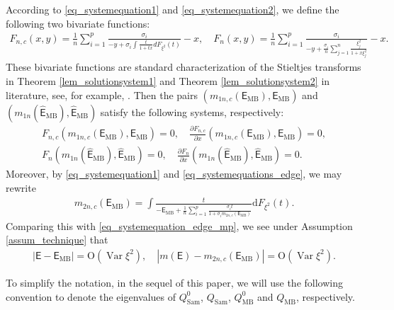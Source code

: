 \documentclass[12pt]{article}
\theoremstyle{plain}
\numberwithin{equation}{section}
\begin{document}
According to \eqref{eq_systemequation1} and \eqref{eq_systemequation2}, we define the following two bivariate functions: 
\begin{align}\label{eq_def_systemequation}
	F_{n,c}(x,y)=\frac{1}{n}\sum_{i=1}^p\frac{\sigma_i}{-y+\sigma_i\int\frac{t}{1+tx}dF_{\xi^2}(t)}-x,\quad F_n(x,y)=\frac{1}{n}\sum_{i=1}^p\frac{\sigma_i}{-y+\frac{\sigma_i}{n}\sum_{j=1}^n\frac{\xi^2_j}{1+x\xi^2_j}}-x.
\end{align}
These bivariate functions are standard characterization of the Stieltjes transforms in Theorem \ref{lem_solutionsystem1} and Theorem \ref{lem_solutionsystem2} in literature, see, for example, \citep{DingYang2021,YuZhaoZhou2025,boostsanalysis}.
Then the pairs $(m_{1n,c}(\mathsf{E}_{\mathrm{MB}}),\mathsf{E}_{\mathrm{MB}})$ and $(m_{1n}(\widehat{\mathsf{E}}_{\mathrm{MB}}),\widehat{\mathsf{E}}_{\mathrm{MB}})$ satisfy the following systems, respectively:
\begin{gather}\label{eq_systemequations_edge}
	F_{n,c}(m_{1n,c}(\mathsf{E}_{\mathrm{MB}}),\mathsf{E}_{\mathrm{MB}})=0,\quad \frac{\partial F_{n,c}}{\partial x}(m_{1n,c}(\mathsf{E}_{\mathrm{MB}}),\mathsf{E}_{\mathrm{MB}})=0,\\
	F_{n}(m_{1n}(\widehat{\mathsf{E}}_{\mathrm{MB}}),\widehat{\mathsf{E}}_{\mathrm{MB}})=0,\quad\frac{\partial F_n}{\partial x}(m_{1n}(\widehat{\mathsf{E}}_{\mathrm{MB}}),\widehat{\mathsf{E}}_{\mathrm{MB}})=0.
\end{gather}
Moreover, by \eqref{eq_systemequation1} and \eqref{eq_systemequations_edge}, we may rewrite
\begin{align*}
	m_{2n,c}(\mathsf{E}_{\mathrm{MB}})=\int\frac{t}{-\mathsf{E}_{\mathrm{MB}}+\frac{1}{n}\sum_{i=1}^p\frac{\sigma_i t}{1+\sigma_im_{2n,c}(\mathsf{E}_{\mathrm{MB}})}}\mathrm{d}F_{\xi^2}(t).
\end{align*}
Comparing this with \eqref{eq_systemequation_edge_mp}, we see under Assumption \ref{assum_technique} that
\begin{align}\label{eq_control_edgebias}
	|\mathsf{E}-\mathsf{E}_{\mathrm{MB}}|=\mathrm{O}(\operatorname{Var}\xi^2),\quad |m(\mathsf{E})-m_{2n,c}(\mathsf{E}_{\mathrm{MB}})|=\mathrm{O}(\operatorname{Var}\xi^2).
\end{align}

To simplify the notation, in the sequel of this paper, we will use the following convention to denote the eigenvalues of $Q^0_{\mathrm{Sam}}$, $Q_{\mathrm{Sam}}$, $Q^0_{\mathrm{MB}}$ and $Q_{\mathrm{MB}}$, respectively.
\end{document}
